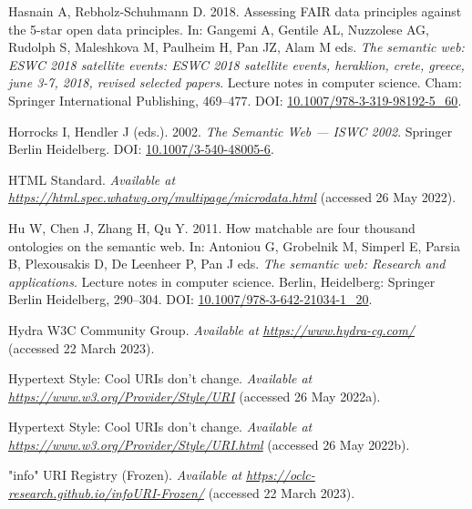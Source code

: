 \begin{CSLReferences}{1}{0}
\leavevmode{}%
Hasnain A, Rebholz-Schuhmann D. 2018. Assessing FAIR data principles against the 5-star open data principles. In: Gangemi A, Gentile AL, Nuzzolese AG, Rudolph S, Maleshkova M, Paulheim H, Pan JZ, Alam M eds. \emph{The semantic web: ESWC 2018 satellite events: ESWC 2018 satellite events, heraklion, crete, greece, june 3-7, 2018, revised selected papers}. Lecture notes in computer science. Cham: Springer International Publishing, 469--477. DOI: \href{https://doi.org/10.1007/978-3-319-98192-5_60}{10.1007/978-3-319-98192-5\_60}.

\leavevmode{}%
Horrocks I, Hendler J (eds.). 2002. \emph{The Semantic Web --- ISWC 2002}. Springer Berlin Heidelberg. DOI: \href{https://doi.org/10.1007/3-540-48005-6}{10.1007/3-540-48005-6}.

\leavevmode{}%
HTML Standard. \emph{Available at} \href{https://html.spec.whatwg.org/multipage/microdata.html}{\emph{https://html.spec.whatwg.org/multipage/microdata.html}} (accessed 26 May 2022).

\leavevmode{}%
Hu W, Chen J, Zhang H, Qu Y. 2011. How matchable are four thousand ontologies on the semantic web. In: Antoniou G, Grobelnik M, Simperl E, Parsia B, Plexousakis D, De Leenheer P, Pan J eds. \emph{The semantic web: Research and applications}. Lecture notes in computer science. Berlin, Heidelberg: Springer Berlin Heidelberg, 290--304. DOI: \href{https://doi.org/10.1007/978-3-642-21034-1_20}{10.1007/978-3-642-21034-1\_20}.

\leavevmode{}%
Hydra W3C Community Group. \emph{Available at} \href{https://www.hydra-cg.com/}{\emph{https://www.hydra-cg.com/}} (accessed 22 March 2023).

\leavevmode{}%
Hypertext Style: Cool URIs don't change. \emph{Available at} \href{https://www.w3.org/Provider/Style/URI}{\emph{https://www.w3.org/Provider/Style/URI}} (accessed 26 May 2022a).

\leavevmode{}%
Hypertext Style: Cool URIs don't change. \emph{Available at} \href{https://www.w3.org/Provider/Style/URI.html}{\emph{https://www.w3.org/Provider/Style/URI.html}} (accessed 26 May 2022b).

\leavevmode{}%
"info" URI Registry (Frozen). \emph{Available at} \href{https://oclc-research.github.io/infoURI-Frozen/}{\emph{https://oclc-research.github.io/infoURI-Frozen/}} (accessed 22 March 2023).


\end{CSLReferences}
